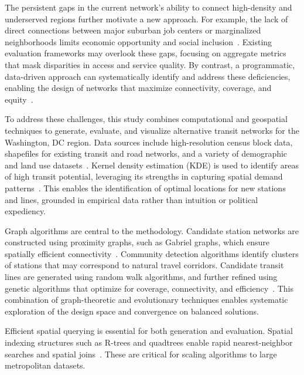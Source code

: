 \documentclass[manuscript]{acmart}
\begin{document}
The persistent gaps in the current network's ability to connect high-density and underserved regions further motivate a new approach. For example, the lack of direct connections between major suburban job centers or marginalized neighborhoods limits economic opportunity and social inclusion~\cite{bib:overview-field}. Existing evaluation frameworks may overlook these gaps, focusing on aggregate metrics that mask disparities in access and service quality. By contrast, a programmatic, data-driven approach can systematically identify and address these deficiencies, enabling the design of networks that maximize connectivity, coverage, and equity~\cite{bib:bast2016route, bib:camporeale2016equity}.

To address these challenges, this study combines computational and geospatial techniques to generate, evaluate, and visualize alternative transit networks for the Washington, DC region. Data sources include high-resolution census block data, shapefiles for existing transit and road networks, and a variety of demographic and land use datasets~\cite{lit:opendata, lit:census}. Kernel density estimation (KDE) is used to identify areas of high transit potential, leveraging its strengths in capturing spatial demand patterns~\cite{bib:silverman1986density}. This enables the identification of optimal locations for new stations and lines, grounded in empirical data rather than intuition or political expediency.

Graph algorithms are central to the methodology. Candidate station networks are constructed using proximity graphs, such as Gabriel graphs, which ensure spatially efficient connectivity~\cite{bib:samet1984quadtrees, bib:libera1986btrees}. Community detection algorithms identify clusters of stations that may correspond to natural travel corridors. Candidate transit lines are generated using random walk algorithms, and further refined using genetic algorithms that optimize for coverage, connectivity, and efficiency~\cite{bib:chien2001genetic, bib:dib2017ga}. This combination of graph-theoretic and evolutionary techniques enables systematic exploration of the design space and convergence on balanced solutions.

Efficient spatial querying is essential for both generation and evaluation. Spatial indexing structures such as R-trees and quadtrees enable rapid nearest-neighbor searches and spatial joins~\cite{bib:samet1984quadtrees, bib:libera1986btrees}. These are critical for scaling algorithms to large metropolitan datasets.
\end{document}
